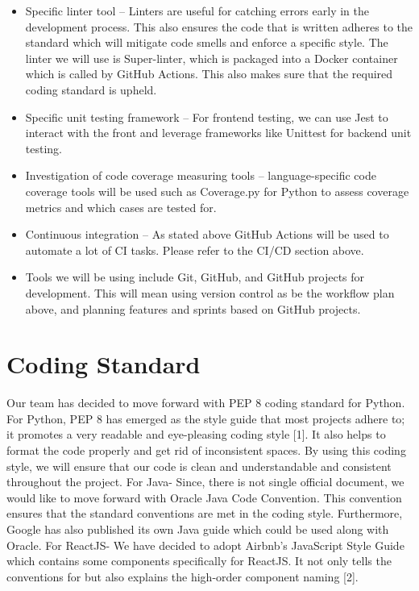 \documentclass{article}
\begin{document}
\begin{itemize}
  \item Specific linter tool -- Linters are useful for catching errors early in the development process. This also ensures the code that is written adheres to the standard which will mitigate code smells and enforce a specific style. The linter we will use is Super-linter, which is packaged into a Docker container which is called by GitHub Actions. This also makes sure that the required coding standard is upheld.
  \item Specific unit testing framework -- For frontend testing, we can use Jest to interact with the front and leverage frameworks like Unittest for backend unit testing.
  \item Investigation of code coverage measuring tools -- language-specific code coverage tools will be used such as Coverage.py for Python to assess coverage metrics and which cases are tested for.
  \item Continuous integration -- As stated above GitHub Actions will be used to automate a lot of CI tasks. Please refer to the CI/CD section above.

  \item Tools we will be using include Git, GitHub, and GitHub projects for development. This will mean using version control as be the workflow plan above, and planning features and sprints based on GitHub projects. 
\end{itemize}

\section{Coding Standard}

Our team has decided to move forward with PEP 8 coding standard for Python. For Python, PEP 8 has emerged as the style guide that most projects adhere to; it promotes a very readable and eye-pleasing coding style [1]. It also helps to format the code properly and get rid of inconsistent spaces. By using this coding style, we will ensure that our code is clean and understandable and consistent throughout the project.
For Java- Since, there is not single official document, we would like to move forward with Oracle Java Code Convention. This convention ensures that the standard conventions are met in the coding style. Furthermore, Google has also published its own Java guide which could be used along with Oracle.
For ReactJS- We have decided to adopt Airbnb's JavaScript Style Guide which contains some components specifically for ReactJS. It not only tells the conventions for but also explains the high-order component naming [2].
\end{document}
